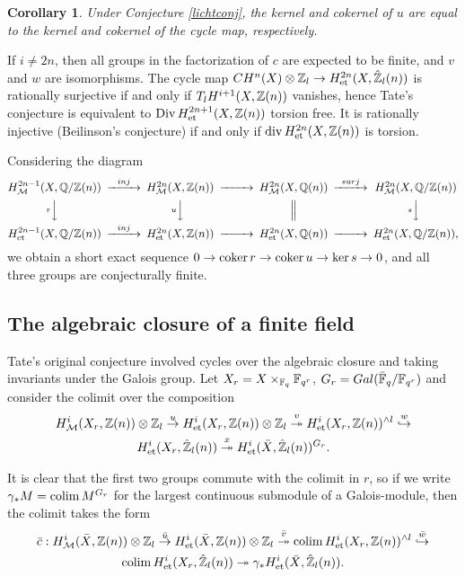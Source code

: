 \documentclass[nospthms,envcountsect]{svmult} %
\newtheorem{corollary}  [theorem]       {Corollary}
\begin{document}
\begin{corollary}\label{tatecor}
Under Conjecture \ref{lichtconj}, the kernel and cokernel of $u$ are 
equal to the kernel and cokernel of the cycle map, respectively.
\end{corollary}

\proof
If $i\not=2n$, then all groups in the factorization of $c$
are expected to be finite, and $v$ and $w$ are isomorphisms.
The cycle map $CH^n(X)\otimes {{\mathbb Z}}_l\to H^{2n}_{\text{\rm et}}(X,\hat{{{\mathbb Z}}}_l(n))$
is rationally surjective if and only if 
$T_lH^{i+1}(X,{{\mathbb Z}}(n))$ vanishes, hence
Tate's conjecture is equivalent to $\operatorname{Div} H^{2n+1}_{\text{\rm et}}(X,{{\mathbb Z}}(n))$ 
torsion free.
It is rationally injective (Beilinson's
conjecture) if and only if $\operatorname{div} H^{2n}_{\text{\rm et}}(X,{{\mathbb Z}}(n))$ is torsion.
\proofend


Considering the diagram 
$$\begin{CD}
H^{2n-1}_\Nis(X,\Q/\Z(n))@>inj>> H^{2n}_\Nis(X,\Z(n))@>>> H^{2n}_\Nis(X,\Q(n))
@>surj>> H^{2n}_\Nis(X,\Q/\Z(n))\\
@VrVV @VuVV @| @VsVV \\
H^{2n-1}_\et(X,\Q/\Z(n))@>inj>> H^{2n}_\et(X,\Z(n))@>>> H^{2n}_\et(X,\Q(n))
@>>> H^{2n}_\et(X,\Q/\Z(n)),
\end{CD}$$
we obtain a short exact sequence
$0\to \operatorname{coker} r\to \operatorname{coker} u\to \ker s\to 0$, and all three groups
are conjecturally finite.



\subsection{The algebraic closure of a finite field}
Tate's original conjecture involved cycles over
the algebraic closure and taking invariants under the Galois group.
Let $X_r=X\times_{{{\mathbb F}}_q}{{\mathbb F}}_{q^r}$, $G_r=Gal(\bar {{{\mathbb F}}}_q/{{\mathbb F}}_{q^r})$
and consider the colimit over the composition
\begin{multline}\label{colimcycbar}
H^i_{\mathcal M}(X_r,{{\mathbb Z}}(n))\otimes{{\mathbb Z}}_l \stackrel{u}{\to} H^i_{\text{\rm et}}(X_r,{{\mathbb Z}}(n))\otimes{{\mathbb Z}}_l
\stackrel{v}{\twoheadrightarrow} H^i_{\text{\rm et}}(X_r,{{\mathbb Z}}(n))^{\wedge l}
\stackrel{w}{\hookrightarrow}\\ 
H^i_{\text{\rm et}}(X_r,\hat{{{\mathbb Z}}}_l(n))\stackrel{x}{\twoheadrightarrow}
H^i_{\text{\rm et}}(\bar X,\hat{{{\mathbb Z}}}_l(n))^{G_r}.
\end{multline}


It is clear that the first two groups commute with the colimit in $r$, so
if we write $\gamma_*M=\colim M^{G_r}$ for the largest
continuous submodule of a Galois-module, then 
the colimit takes the form 
\begin{multline}\label{colimcyc}
\bar c: H^i_\Nis(\bar X,\Z(n))\otimes\Z_l \stackrel{\bar u}{\to} 
H^i_\et(\bar X,\Z(n))\otimes\Z_l
\stackrel{\bar v}{\twoheadrightarrow} \colim H^i_\et(X_r,\Z(n))^{\wedge l}
\stackrel{\bar w}{\hookrightarrow}\\ 
\colim H^i_\et(X_r,\hat\Z_l(n))\twoheadrightarrow
\gamma_* H^i_\et(\bar X,\hat\Z_l(n)).
\end{multline}
\end{document}
